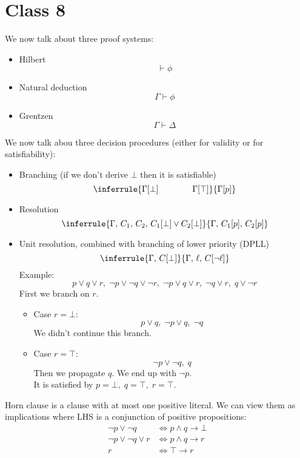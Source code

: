 {{%

\chapter{Class 8}

We now talk about three proof systems:
\begin{itemize}
\item Hilbert $$\vdash \phi$$
\item Natural deduction $$\Gamma \vdash \phi$$
\item Grentzen $$\Gamma \vdash \Delta$$
\end{itemize}
We now talk abou three decision procedures (either for validity or for satisfiability):
\begin{itemize}
\item Branching (if we don't derive $\bot$ then it is satisfiable)
$$\inferrule
{\Gamma[\bot]\qquad\qquad\Gamma[\top]}
{\Gamma[p]}
$$
\item Resolution
$$\inferrule
{\Gamma,\, C_1,\, C_2,\, C_1[\bot] \vee C_2[\bot]}
{\Gamma,\, C_1[p],\, C_2[p]}
$$
\item Unit resolution, combined with branching of lower priority (DPLL)
$$\inferrule
{\Gamma,\, C[\bot]}
{\Gamma,\, \ell,\, C[\neg\ell]}
$$
Example: $$p \vee q \vee r ,\; \neg p \vee \neg q \vee \neg r ,\; \neg p \vee q \vee r ,\; \neg q \vee r ,\; q \vee \neg r$$
First we branch on $r$.
\begin{itemize}
\item Case $r=\bot$:
$$p \vee q ,\; \neg p \vee q ,\; \neg q$$
We didn't continue this branch.
\item Case $r=\top$:
$$\neg p \vee \neg q ,\; q$$
Then we propagate $q$. We end up with $\neg p$.\\
It is satisfied by $p=\bot,\; q=\top,\; r=\top$.
\end{itemize}
\end{itemize}

Horn clause is a clause with at most one positive literal.
We can view them as implications where LHS is a conjunction of positive propositions:
\begin{align*}
\neg p \vee \neg q 
	&\iff p \wedge q \rightarrow \bot \\
\neg p \vee \neg q \vee r 
	&\iff p \wedge q \rightarrow r \\
r 
	&\iff \top \rightarrow r \\
\end{align*}

}}
